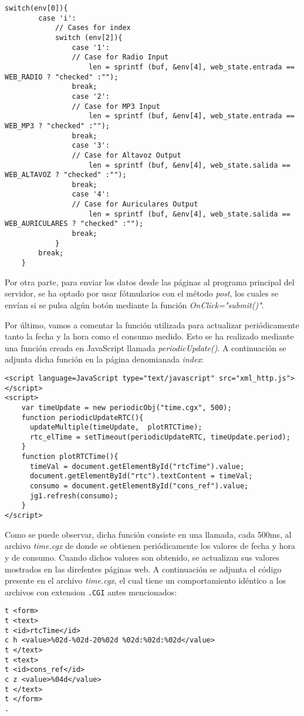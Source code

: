 \begin{lstlisting}[captionpos=b, caption={Ejemplo procesamiento archivo .CGI}]
	switch(env[0]){
		case 'i':
			// Cases for index
			switch (env[2]){
				case '1':
				// Case for Radio Input
					len = sprintf (buf, &env[4], web_state.entrada == WEB_RADIO ? "checked" :"");
				break;
				case '2':
				// Case for MP3 Input
					len = sprintf (buf, &env[4], web_state.entrada == WEB_MP3 ? "checked" :"");
				break;
				case '3':
				// Case for Altavoz Output
					len = sprintf (buf, &env[4], web_state.salida == WEB_ALTAVOZ ? "checked" :"");
				break;
				case '4':
				// Case for Auriculares Output
					len = sprintf (buf, &env[4], web_state.salida == WEB_AURICULARES ? "checked" :"");
				break;
            }
        break;
    }
\end{lstlisting}

Por otra parte, para enviar los datos desde las páginas al programa principal del servidor, se ha optado por usar fótmularios con el método \textit{post}, los cuales se envían si se pulsa algún botón mediante la función \textit{OnClick="submit()"}.

Por último, vamos a comentar la función utilizada para actualizar periódicamente tanto la fecha y la hora como el consumo medido. Esto se ha realizado mediante una función creada en JavaScript llamada \textit{periodicUpdate()}. A continuación se adjunta dicha función en la página denomianada \textit{index}:

\begin{lstlisting}[captionpos=b, caption={Función updatePeriodic()}]
<script language=JavaScript type="text/javascript" src="xml_http.js"></script>
<script>
    var timeUpdate = new periodicObj("time.cgx", 500);
    function periodicUpdateRTC(){
      updateMultiple(timeUpdate,  plotRTCTime);
      rtc_elTime = setTimeout(periodicUpdateRTC, timeUpdate.period);
    }
    function plotRTCTime(){
      timeVal = document.getElementById("rtcTime").value;
      document.getElementById("rtc").textContent = timeVal;
      consumo = document.getElementById("cons_ref").value;
      jg1.refresh(consumo);
    }
</script>
\end{lstlisting}

Como se puede observar, dicha función consiste en una llamada, cada 500ms, al archivo \textit{time.cgx} de donde se obtienen periódicamente los valores de fecha y hora y de consumo. Cuando dichos valores son obtenido, se actualizan sus valores mostrados en las direfentes páginas web. A continuación se adjunta el código presente en el archivo \textit{time.cgx}, el cual tiene un comportamiento idéntico a los archivos con extension \texttt{.CGI} antes mencionados:

\begin{lstlisting}[captionpos=b, caption={Archivo time.cgx}]
t <form>
t <text>
t <id>rtcTime</id>
c h <value>%02d-%02d-20%02d %02d:%02d:%02d</value>
t </text>
t <text>
t <id>cons_ref</id>
c z <value>%04d</value>
t </text>
t </form>
.
\end{lstlisting}
